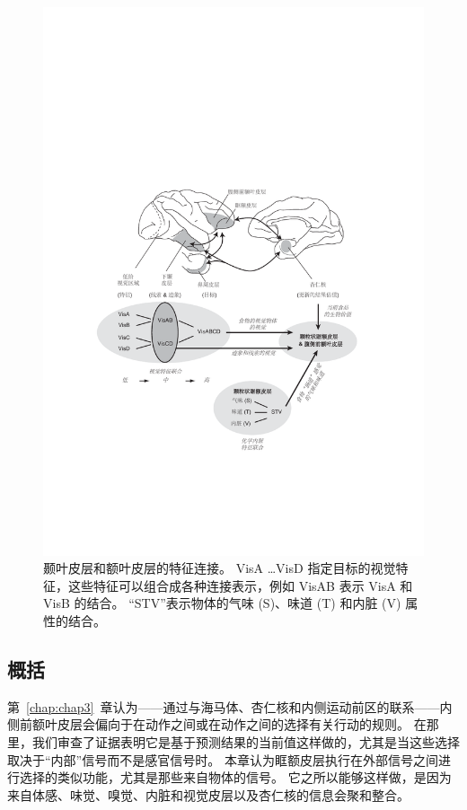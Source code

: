 \begin{figure}[!htb]
	\centering
	\includegraphics{chap4/fig_4_3}
	\caption{颞叶皮层和额叶皮层的特征连接。
		VisA …VisD 指定目标的视觉特征，这些特征可以组合成各种连接表示，例如 VisAB 表示 VisA 和 VisB 的结合。
		“STV”表示物体的气味 (S)、味道 (T) 和内脏 (V) 属性的结合\cite{murray2011can}。}\label{fig:fig_4_3}
\end{figure}



\subsection{概括}

第~\ref{chap:chap3}~章认为——通过与海马体、杏仁核和内侧运动前区的联系——内侧前额叶皮层会偏向于在动作之间或在动作之间的选择有关行动的规则。
在那里，我们审查了证据表明它是基于预测结果的当前值这样做的，尤其是当这些选择取决于“内部”信号而不是感官信号时。
本章认为眶额皮层执行在外部信号之间进行选择的类似功能，尤其是那些来自物体的信号。
它之所以能够这样做，是因为来自体感、味觉、嗅觉、内脏和视觉皮层以及杏仁核的信息会聚和整合。



